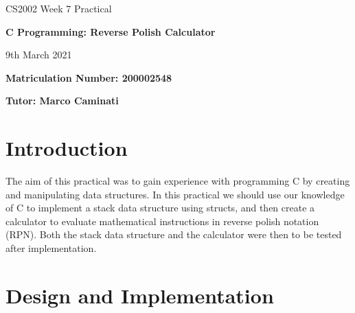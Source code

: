 \documentclass{article}
\begin{document}
\nocite{*}

\begin{center}
\Huge 
CS2002 Week 7 Practical

\vspace{0.5cm}

\textbf{C Programming: Reverse Polish Calculator}

\vspace{1cm}
\LARGE
9th March 2021

\large
\vspace{1.5cm}

\textbf{Matriculation Number: 200002548}

\vspace{0.5cm}

\textbf{Tutor: Marco Caminati}

\end{center}

\vspace*{3cm}	

\tableofcontents

\newpage
\section{Introduction}
The aim of this practical was to gain experience with programming  C by creating and manipulating data structures. In this practical we should use our knowledge of C to implement a stack data structure using structs, and then create a calculator to evaluate mathematical instructions in reverse polish notation (RPN). Both the stack data structure and the calculator were then to be tested after implementation.

\section{Design and Implementation}
\end{document}
